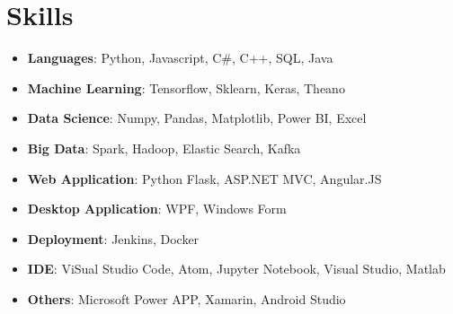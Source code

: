 \documentclass[letterpaper,11pt]{article}
\newcommand{\resumeSubHeadingListStart}{\begin{itemize}[leftmargin=*]}
\newcommand{\resumeSubHeadingListEnd}{\end{itemize}}
\begin{document}
\section{Skills}
  \resumeSubHeadingListStart
    \item{
      \textbf{Languages}{: Python, Javascript, C\#, C++, SQL, Java}
    }
     \item{
      \textbf{Machine Learning}{: Tensorflow, Sklearn, Keras, Theano}
    }
    \item{
     \textbf{Data Science}{: Numpy, Pandas, Matplotlib, Power BI, Excel }
    }
    \item{
     \textbf{Big Data}{: Spark, Hadoop, Elastic Search, Kafka }
    }
    \item{
     \textbf{Web Application}{: Python Flask, ASP.NET MVC, Angular.JS }
    }
    \item{
     \textbf{Desktop Application}{: WPF, Windows Form }
    }
    \item{
     \textbf{Deployment}{: Jenkins, Docker }
    }
    \item{
       \textbf{IDE}{: ViSual Studio Code, Atom, Jupyter Notebook, Visual Studio, Matlab}
    }
     \item{
     \textbf{Others}{:  Microsoft Power APP, Xamarin, Android Studio }
    }
    
    
      
  \resumeSubHeadingListEnd
\end{document}
